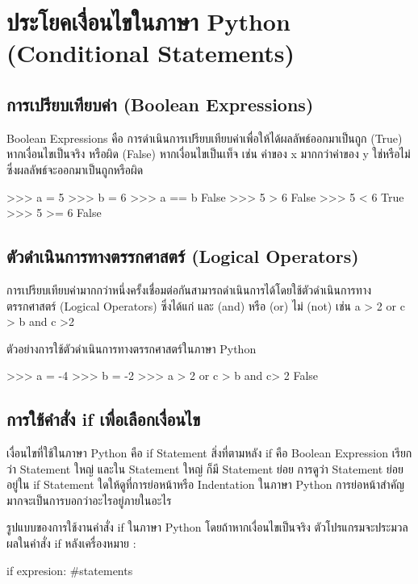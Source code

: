  \chapter {ประโยคเงื่อนไขในภาษา Python (Conditional Statements)}

\section{การเปรียบเทียบค่า (Boolean Expressions)}

Boolean Expressions คือ การดำเนินการเปรียบเทียบค่าเพื่อให้ได้ผลลัพธ์ออกมาเป็นถูก (True) หากเงื่อนไขเป็นจริง หรือผิด (False) หากเงื่อนไขเป็นเท็จ เช่น ค่าของ x มากกว่าค่าของ y ใช่หรือไม่ ซึ่งผลลัพธ์จะออกมาเป็นถูกหรือผิด

\begin{codelist}{}{}
>>> a = 5
>>> b = 6
>>> a == b
False
>>> 5 > 6
False
>>> 5 < 6
True
>>> 5 >= 6
False
\end{codelist}


\section{ตัวดำเนินการทางตรรกศาสตร์ (Logical Operators)}

การเปรียบเทียบค่ามากกว่าหนึ่งครั้งเชื่อมต่อกันสามารถดำเนินการได้โดยใช้ตัวดำเนินการทาง ตรรกศาสตร์ (Logical Operators) ซึ่งได้แก่ และ (and) หรือ (or) ไม่ (not) เช่น a > 2 or c > b and c >2

ตัวอย่างการใช้ตัวดำเนินการทางตรรกศาสตร์ในภาษา Python

\begin{codelist}{}{}
>>> a = -4
>>> b = -2
>>> a > 2 or c > b and c> 2
False
\end{codelist}


\section{การใช้คำสั่ง if เพื่อเลือกเงื่อนไข}

เงื่อนไขที่ใช้ในภาษา Python คือ if Statement สิ่งที่ตามหลัง if คือ Boolean Expression เรียกว่า Statement ใหญ่ และใน Statement ใหญ่ ก็มี Statement ย่อย การดูว่า Statement ย่อยอยู่ใน if Statement ใดให้ดูที่การย่อหน้าหรือ Indentation ในภาษา Python การย่อหน้าสำคัญมากจะเป็นการบอกว่าอะไรอยู่ภายในอะไร 

รูปแบบของการใช้งานคำสั่ง if ในภาษา Python โดยถ้าหากเงื่อนไขเป็นจริง ตัวโปรแกรมจะประมวลผลในคำสั่ง if หลังเครื่องหมาย : 

\begin{codelist}{}{}
if expresion:
    #statements
\end{codelist}


